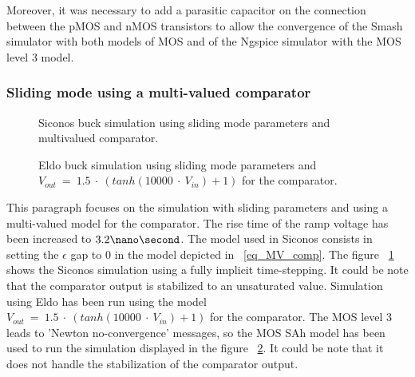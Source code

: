 Moreover, it was necessary to add a parasitic capacitor on the connection between the pMOS and nMOS
transistors to allow the convergence of the {\sc Smash} simulator with both models of MOS
and of the {\sc Ngspice} simulator with the MOS level 3 model.

\subsubsection{Sliding mode using a multi-valued comparator}
\begin{figure}[!ht]
     \hspace{-2mm}
  \caption{{\sc Siconos} buck simulation using sliding mode parameters and multivalued comparator.}
\label{fig:figSimuBuck_Sliding_mv}
\end{figure}

\begin{figure}[!ht]
     \hspace{-2mm}
  \caption{{\sc Eldo} buck simulation using sliding mode parameters and $V_{out}~=~1.5~\cdot~(tanh(10000~\cdot~V_{in}) + 1)$ for the comparator.}
\label{fig:figSimuBuck_Sliding_mv_eldo}
\end{figure}
This paragraph focuses on the simulation with sliding parameters and using a multi-valued model for the comparator. The rise
time of the ramp voltage has been increased to $3.2 \nano \second$. The model used in {\sc Siconos}
consists in setting the $\epsilon$ gap to $0$ in the model depicted in ~\ref{eq_MV_comp}. The figure
~\ref{fig:figSimuBuck_Sliding_mv} shows the {\sc Siconos} simulation using a fully implicit time-stepping. It could be note that
the comparator output is stabilized to an unsaturated value. Simulation using {\sc Eldo} has been
run using the model $V_{out}~=~1.5~\cdot~(tanh(10000~\cdot~V_{in}) + 1)$ for the comparator. The MOS
level 3 leads to 'Newton no-convergence' messages, so the MOS SAh model has been used to run the simulation displayed in the figure ~\ref{fig:figSimuBuck_Sliding_mv_eldo}.
It could be note that it does not handle the stabilization of the comparator output. 





